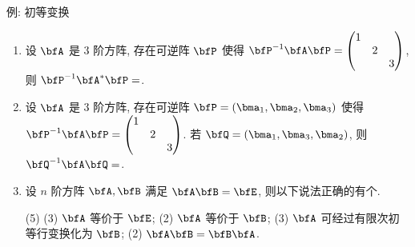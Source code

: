 \begin{frame}{例: 初等变换}
	\onslide<+->
	\begin{exercise}
		\begin{enumerate}
			\item 设 $\bfA$ 是 $3$ 阶方阵, 存在可逆阵 $\bfP$ 使得 $\bfP^{-1}\bfA\bfP=\begin{pmatrix}
				1&&\\&2&\\&&3
			\end{pmatrix}$, 则 $\bfP^{-1}\bfA^*\bfP=$.
			\item 设 $\bfA$ 是 $3$ 阶方阵, 存在可逆阵 $\bfP=(\bma_1,\bma_2,\bma_3)$ 使得 $\bfP^{-1}\bfA\bfP=\begin{pmatrix}
				1&&\\&2&\\&&3
			\end{pmatrix}$.
			若 $\bfQ=(\bma_1,\bma_3,\bma_2)$, 则 $\bfQ^{-1}\bfA\bfQ=$.
			\item 设 $n$ 阶方阵 $\bfA,\bfB$ 满足 $\bfA\bfB=\bfE$, 则以下说法正确的有个.
			\begin{tasks}[label={(\roman*)},label-format=\upshape\textcolor{main}](5)
				\task*(3) $\bfA$ 等价于 $\bfE$;
				\task*(2) $\bfA$ 等价于 $\bfB$;
				\task*(3) $\bfA$ 可经过有限次初等行变换化为 $\bfB$;
				\task*(2) $\bfA\bfB=\bfB\bfA$.
			\end{tasks}
		\end{enumerate}
	\end{exercise}
\end{frame}
